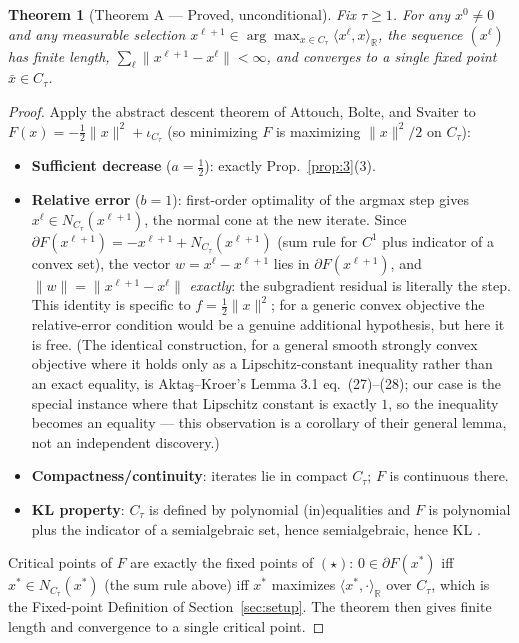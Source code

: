 \documentclass[11pt]{article}
\theoremstyle{plain}
\newtheorem{theorem}{Theorem}[section]
\theoremstyle{definition}
\theoremstyle{remark}
\newcommand{\R}{\mathbb R}
\newcommand{\iC}{\iota_{C_\tau}}
\begin{document}
\begin{theorem}[Theorem A --- Proved, unconditional]\label{thm:A}
Fix $\tau\ge1$. For any $x^0\ne0$ and any measurable selection
$x^{\ell+1}\in\arg\max_{x\in C_\tau}\langle x^\ell,x\rangle_\R$, the sequence
$(x^\ell)$ has finite length, $\sum_\ell\|x^{\ell+1}-x^\ell\|<\infty$, and
converges to a single fixed point $\bar x\in C_\tau$.
\end{theorem}
\begin{proof}
Apply the abstract descent theorem of Attouch, Bolte, and Svaiter
\cite[Thm.~2.9]{ABS13} to $F(x)=-\tfrac12\|x\|^2+\iC$ (so minimizing $F$ is
maximizing $\|x\|^2/2$ on $C_\tau$):
\begin{itemize}
\item \textbf{Sufficient decrease} ($a=\tfrac12$): exactly Prop.~\ref{prop:3}(3).
\item \textbf{Relative error} ($b=1$): first-order
optimality of the argmax step gives $x^\ell\in N_{C_\tau}(x^{\ell+1})$, the
normal cone at the new iterate. Since $\partial F(x^{\ell+1})=-x^{\ell+1}+N_{C_\tau}(x^{\ell+1})$
(sum rule for $C^1$ plus indicator of a convex set), the vector
$w=x^\ell-x^{\ell+1}$ lies in $\partial F(x^{\ell+1})$, and
$\|w\|=\|x^{\ell+1}-x^\ell\|$ \emph{exactly}: the subgradient residual is
literally the step. This identity is specific to $f=\tfrac12\|x\|^2$; for a
generic convex objective the relative-error condition would be a genuine
additional hypothesis, but here it is free. (The identical construction,
for a general smooth strongly convex objective where it holds only as a
Lipschitz-constant inequality rather than an exact equality, is
Aktaş--Kroer's \cite{AK25} Lemma 3.1 eq.~(27)--(28); our case is the
special instance where that Lipschitz constant is exactly $1$, so the
inequality becomes an equality --- this observation is a corollary of
their general lemma, not an independent discovery.)
\item \textbf{Compactness/continuity}: iterates lie in compact $C_\tau$;
$F$ is continuous there.
\item \textbf{KL property}: $C_\tau$ is defined by polynomial (in)equalities
and $F$ is polynomial plus the indicator of a semialgebraic set, hence
semialgebraic, hence KL \cite{BDLS07}.
\end{itemize}
Critical points of $F$ are exactly the fixed points of $(\star)$: $0\in\partial F(x^*)$
iff $x^*\in N_{C_\tau}(x^*)$ (the sum rule above) iff $x^*$ maximizes
$\langle x^*,\cdot\rangle_\R$ over $C_\tau$, which is the Fixed-point
Definition of Section~\ref{sec:setup}. The theorem then gives finite length and
convergence to a single critical point.
\end{proof}
\end{document}
